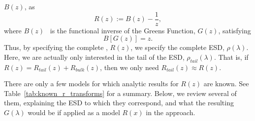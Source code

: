 $B(z)$, as 
\begin{equation}
\label{eqn:Rz}
R(z):=B(z)-\frac{1}{z}  ,
\end{equation}
where $B(z)$~\cite{Zee1996} is the functional inverse of the Greens Function, $G(z)$,
satisfying 
\begin{equation}
\label{eqn:GzRelation}
B[G(z)]=z  .
\end{equation}
Thus, by specifying the complete \RTransform, $R(z)$, we specify the complete ESD, $\rho(\lambda)$.
Here, we are actually only interested in the tail of the ESD, $\rho_{tail}(\lambda)$.
That is, if $R(z)=R_{tail}(z)+R_{bulk}(z)$, then we only need $R_{tail}(z)\approx R(z)$.



There are only a few models for which analytic results for $R(z)$ are known.
See Table~\ref{tab:known_r_transforms} for a summary.
Below, we review several of them, explaining the ESD to which they correspond,
and what the resulting $G(\lambda)$ would be if applied
as a model $R(x)$ in the \SETOL approach.


